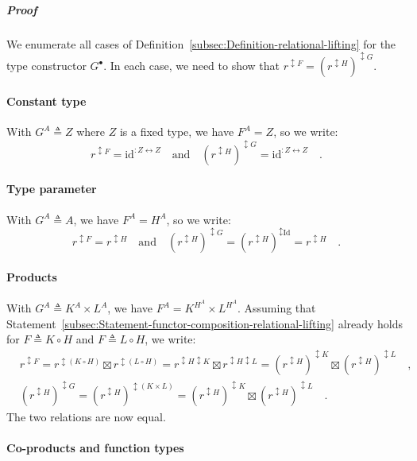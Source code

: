 \subparagraph{Proof}

We enumerate all cases of Definition~\ref{subsec:Definition-relational-lifting}
for the type constructor $G^{\bullet}$. In each case, we need to
show that $r^{\updownarrow F}=(r^{\updownarrow H})^{\updownarrow G}$.

\paragraph{Constant type}

With $G^{A}\triangleq Z$ where $Z$ is a fixed type, we have $F^{A}=Z$,
so we write:
\[
r^{\updownarrow F}=\text{id}^{:Z\leftrightarrow Z}\quad\text{and}\quad(r^{\updownarrow H})^{\updownarrow G}=\text{id}^{:Z\leftrightarrow Z}\quad.
\]


\paragraph{Type parameter}

With $G^{A}\triangleq A$, we have $F^{A}=H^{A}$, so we write:
\[
r^{\updownarrow F}=r^{\updownarrow H}\quad\text{and}\quad(r^{\updownarrow H})^{\updownarrow G}=(r^{\updownarrow H})^{\updownarrow\text{Id}}=r^{\updownarrow H}\quad.
\]


\paragraph{Products}

With $G^{A}\triangleq K^{A}\times L^{A}$, we have $F^{A}=K^{H^{A}}\times L^{H^{A}}$.
Assuming that Statement~\ref{subsec:Statement-functor-composition-relational-lifting}
already holds for $F\triangleq K\circ H$ and $F\triangleq L\circ H$,
we write:
\begin{align*}
 & r^{\updownarrow F}=r^{\updownarrow(K\circ H)}\boxtimes r^{\updownarrow(L\circ H)}=r^{\updownarrow H\updownarrow K}\boxtimes r^{\updownarrow H\updownarrow L}=(r^{\updownarrow H})^{\updownarrow K}\boxtimes(r^{\updownarrow H})^{\updownarrow L}\quad,\\
 & (r^{\updownarrow H})^{\updownarrow G}=(r^{\updownarrow H})^{\updownarrow(K\times L)}=(r^{\updownarrow H})^{\updownarrow K}\boxtimes(r^{\updownarrow H})^{\updownarrow L}\quad.
\end{align*}
The two relations are now equal.

\paragraph{Co-products and function types}

